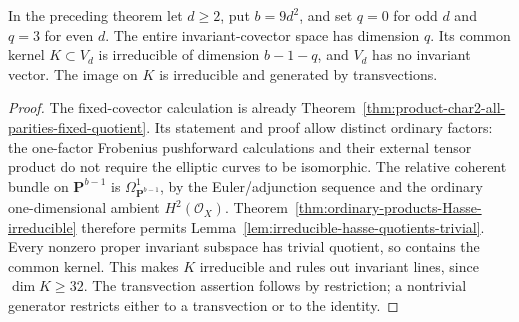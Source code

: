 \begin{corollary}
\label{cor:ordinary-products-irreducible-kernel}
In the preceding theorem let $d\ge2$, put $b=9d^2$, and set
$q=0$ for odd $d$ and $q=3$ for even $d$.
The entire invariant-covector space has dimension $q$.
Its common kernel $K\subset V_d$ is irreducible of dimension
$b-1-q$, and $V_d$ has no invariant vector.
The image on $K$ is irreducible and generated by transvections.
\end{corollary}

\begin{proof}
The fixed-covector calculation is already
Theorem~\ref{thm:product-char2-all-parities-fixed-quotient}.
Its statement and proof allow distinct ordinary factors: the
one-factor Frobenius pushforward calculations and their external
tensor product do not require the elliptic curves to be isomorphic.
The relative coherent bundle on $\mathbf P^{b-1}$ is
$\Omega^1_{\mathbf P^{b-1}}$, by the Euler/adjunction sequence
and the ordinary one-dimensional ambient $H^2(\mathcal O_X)$.
Theorem~\ref{thm:ordinary-products-Hasse-irreducible} therefore
permits Lemma~\ref{lem:irreducible-hasse-quotients-trivial}.
Every nonzero proper invariant subspace has trivial quotient,
so contains the common kernel. This makes $K$ irreducible and
rules out invariant lines, since $\dim K\ge32$.
The transvection assertion follows by restriction; a nontrivial
generator restricts either to a transvection or to the identity.
\end{proof}
